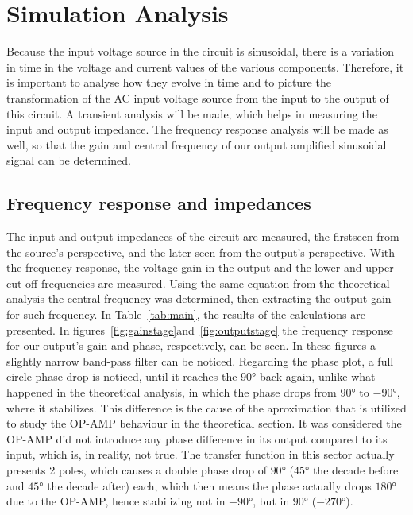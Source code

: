 \section{Simulation Analysis}
\label{sec:simulation}
Because the input voltage source in the circuit is sinusoidal, there is a variation in time in the voltage and current values of the various components. Therefore, it is important to analyse how they evolve in time and to picture the transformation of the AC input voltage source from the input to the output of this circuit. A transient analysis will be made, which helps in measuring the input and output impedance. The frequency response analysis will be made as well, so that the gain and central frequency of our output amplified sinusoidal signal can be determined.

\subsection{Frequency response and impedances}

The input and output impedances of the circuit are measured, the firstseen from the source's perspective, and the later seen from the output's perspective. With the frequency response, the voltage gain in the output and the lower and upper cut-off frequencies are measured. Using the same equation from the theoretical analysis the central frequency was determined, then extracting the output gain for such frequency. In Table~\ref{tab:main}, the results of the calculations are presented. In figures~\ref{fig:gainstage}and~\ref{fig:outputstage} the frequency response for our output's gain and phase, respectively, can be seen. In these figures a slightly narrow band-pass filter can be noticed. Regarding the phase plot, a full circle phase drop is noticed, until it reaches the $\ang{90}$ back again, unlike what happened in the theoretical analysis, in which the phase drops from $\ang{90}$ to $\ang{-90}$, where it stabilizes. This difference is the cause of the aproximation that is utilized to study the OP-AMP behaviour in the theoretical section. It was considered the OP-AMP did not introduce any phase difference in its output compared to its input, which is, in reality, not true. The transfer function in this sector actually presents 2 poles, which causes a double phase drop of $\ang{90}$ ($\ang{45}$ the decade before and $\ang{45}$ the decade after) each, which then means the phase actually drops $\ang{180}$ due to the OP-AMP, hence stabilizing not in $\ang{-90}$, but in $\ang{90}$ ($\ang{-270}$).

